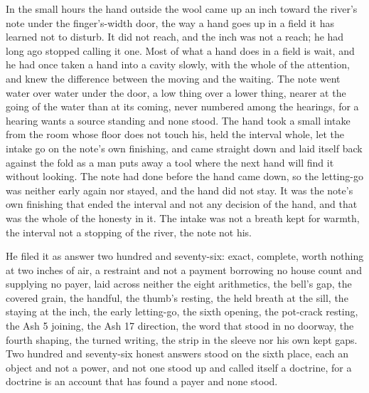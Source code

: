 \scenebreak

In the small hours the hand outside the wool came up an inch toward the river’s note under the finger’s-width door, the way a hand goes up in a field it has learned not to disturb. It did not reach, and the inch was not a reach; he had long ago stopped calling it one. Most of what a hand does in a field is wait, and he had once taken a hand into a cavity slowly, with the whole of the attention, and knew the difference between the moving and the waiting. The note went water over water under the door, a low thing over a lower thing, nearer at the going of the water than at its coming, never numbered among the hearings, for a hearing wants a source standing and none stood. The hand took a small intake from the room whose floor does not touch his, held the interval whole, let the intake go on the note’s own finishing, and came straight down and laid itself back against the fold as a man puts away a tool where the next hand will find it without looking. The note had done before the hand came down, so the letting-go was neither early again nor stayed, and the hand did not stay. It was the note’s own finishing that ended the interval and not any decision of the hand, and that was the whole of the honesty in it. The intake was not a breath kept for warmth, the interval not a stopping of the river, the note not his.

He filed it as answer two hundred and seventy-six: exact, complete, worth nothing at two inches of air, a restraint and not a payment borrowing no house count and supplying no payer, laid across neither the eight arithmetics, the bell’s gap, the covered grain, the handful, the thumb’s resting, the held breath at the sill, the staying at the inch, the early letting-go, the sixth opening, the pot-crack resting, the Ash 5 joining, the Ash 17 direction, the word that stood in no doorway, the fourth shaping, the turned writing, the strip in the sleeve nor his own kept gaps. Two hundred and seventy-six honest answers stood on the sixth place, each an object and not a power, and not one stood up and called itself a doctrine, for a doctrine is an account that has found a payer and none stood.

